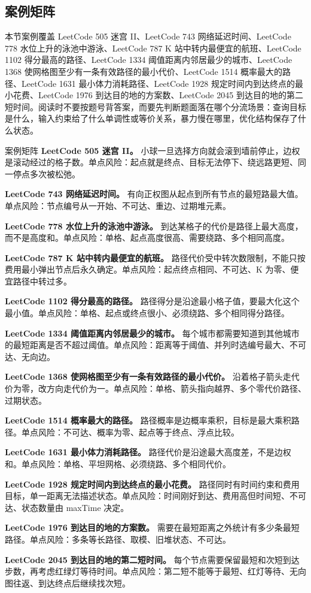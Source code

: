 \subsection{案例矩阵}

本节案例覆盖 LeetCode 505 迷宫 II、LeetCode 743 网络延迟时间、LeetCode 778 水位上升的泳池中游泳、LeetCode 787 K 站中转内最便宜的航班、LeetCode 1102 得分最高的路径、LeetCode 1334 阈值距离内邻居最少的城市、LeetCode 1368 使网格图至少有一条有效路径的最小代价、LeetCode 1514 概率最大的路径、LeetCode 1631 最小体力消耗路径、LeetCode 1928 规定时间内到达终点的最小花费、LeetCode 1976 到达目的地的方案数、LeetCode 2045 到达目的地的第二短时间。阅读时不要按题号背答案，而要先判断题面落在哪个分流场景：查询目标是什么，输入约束给了什么单调性或等价关系，暴力慢在哪里，优化结构保存了什么状态。

\begin{principlebox}{案例矩阵}
\textbf{LeetCode 505 迷宫 II。}
小球一旦选择方向就会滚到墙前停止，边权是滚动经过的格子数。单点风险：起点就是终点、目标无法停下、绕远路更短、同一停点多次被松弛。

\textbf{LeetCode 743 网络延迟时间。}
有向正权图从起点到所有节点的最短路最大值。单点风险：节点编号从一开始、不可达、重边、过期堆元素。

\textbf{LeetCode 778 水位上升的泳池中游泳。}
到达某格子的代价是路径上最大高度，而不是高度和。单点风险：单格、起点高度很高、需要绕路、多个相同高度。

\textbf{LeetCode 787 K 站中转内最便宜的航班。}
路径代价受中转次数限制，不能只按费用最小弹出节点后永久确定。单点风险：起点终点相同、不可达、K 为零、便宜路径中转过多。

\textbf{LeetCode 1102 得分最高的路径。}
路径得分是沿途最小格子值，要最大化这个最小值。单点风险：单格、起点或终点很小、必须绕路、多个相同得分路径。

\textbf{LeetCode 1334 阈值距离内邻居最少的城市。}
每个城市都需要知道到其他城市的最短距离是否不超过阈值。单点风险：距离等于阈值、并列时选编号最大、不可达、无向边。

\textbf{LeetCode 1368 使网格图至少有一条有效路径的最小代价。}
沿着格子箭头走代价为零，改方向走代价为一。单点风险：单格、箭头指向越界、多个零代价路径、过期状态。

\textbf{LeetCode 1514 概率最大的路径。}
路径概率是边概率乘积，目标是最大乘积路径。单点风险：不可达、概率为零、起点等于终点、浮点比较。

\textbf{LeetCode 1631 最小体力消耗路径。}
路径代价是沿途最大高度差，不是边权和。单点风险：单格、平坦网格、必须绕路、多个相同代价。

\textbf{LeetCode 1928 规定时间内到达终点的最小花费。}
路径同时有时间约束和费用目标，单一距离无法描述状态。单点风险：时间刚好到达、费用高但时间短、不可达、状态数量由 maxTime 决定。

\textbf{LeetCode 1976 到达目的地的方案数。}
需要在最短距离之外统计有多少条最短路径。单点风险：多条等长路径、取模、旧堆状态、不可达。

\textbf{LeetCode 2045 到达目的地的第二短时间。}
每个节点需要保留最短和次短到达步数，再考虑红绿灯等待时间。单点风险：第二短不能等于最短、红灯等待、无向图往返、到达终点后继续找次短。

\end{principlebox}

